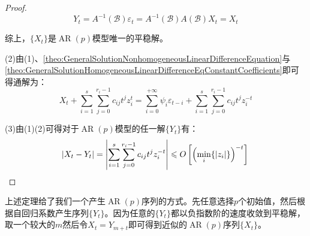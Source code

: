 \begin{proof}
\begin{equation*}
		Y_t=A^{-1}(\mathcal{B})\varepsilon_t=A^{-1}(\mathcal{B})A(\mathcal{B})X_t=X_t
	\end{equation*}\par
	综上，$\{X_t\}$是$\operatorname{AR}(p)$模型唯一的平稳解。\par
	(2)由(1)、\cref{theo:GeneralSolutionNonhomogeneousLinearDifferenceEquation}与\cref{theo:GeneralSolutionHomogeneousLinearDifferenceEqConstantCoefficients}即可得通解为：
	\begin{equation*}
		X_t+\sum_{i=1}^{s}\sum_{j=0}^{r_i-1}c_{ij}t^{j}z_i^t=\sum_{i=0}^{+\infty}\psi_i\varepsilon_{t-i}+\sum_{i=1}^{s}\sum_{j=0}^{r_i-1}c_{ij}t^{j}z_i^{-t}
	\end{equation*}\par
	(3)由(1)(2)可得对于$\operatorname{AR}(p)$模型的任一解$\{Y_t\}$有：
	\begin{equation*}
		|X_t-Y_t|=\left|\sum_{i=1}^{s}\sum_{j=0}^{r_i-1}c_{ij}t^{j}z_i^{-t}\right|\leqslant O\left[\left(\min_i\{|z_i|\}\right)^{-t}\right]\qedhere
	\end{equation*}
\end{proof}
\begin{note}
	上述定理给了我们一个产生$\operatorname{AR}(p)$序列的方式。先任意选择$p$个初始值，然后根据自回归系数产生序列$\{Y_t\}$。因为任意的$\{Y_t\}$都以负指数阶的速度收敛到平稳解，取一个较大的$m$然后令$X_t=Y_{m+t}$即可得到近似的$\operatorname{AR}(p)$序列$\{X_t\}$。
\end{note}
